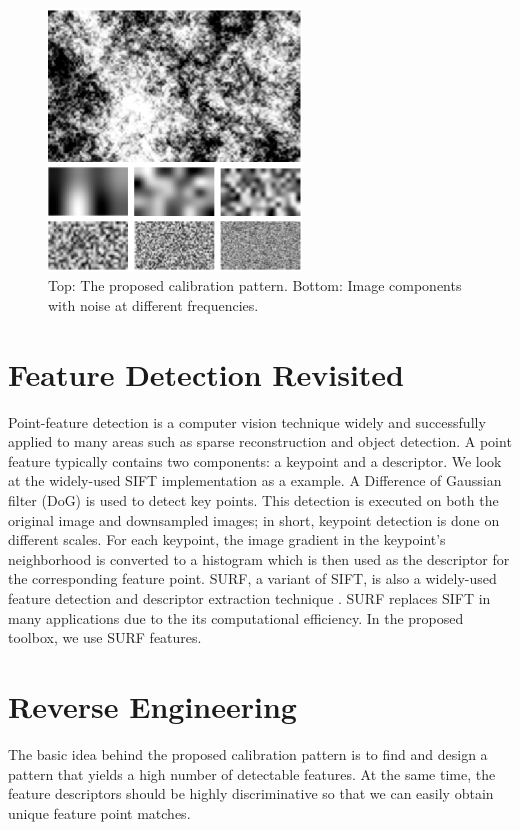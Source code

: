 \documentclass{report}
\begin{document}
\begin{figure}
\centering
\includegraphics[width=0.6\textwidth]{images/patternsample}
\caption{Top: The proposed calibration pattern. Bottom: Image components with noise at different frequencies.}
\label{PatternFig}
\end{figure}


\label{PatternSec}
\section{Feature Detection Revisited}

Point-feature detection is a computer vision technique widely and successfully applied to many areas such as sparse reconstruction and object detection. A point feature typically contains two components: a keypoint and a descriptor. We look at the widely-used SIFT implementation \cite{lowe2004distinctive} as a example. A Difference of Gaussian filter (DoG) is used to detect key points. This detection is executed on both the original image and downsampled images; in short, keypoint detection is done on different scales. For each keypoint, the image gradient in the keypoint's neighborhood is converted to a histogram which is then used as the descriptor for the corresponding feature point. SURF, a variant of SIFT, is also a widely-used feature detection and descriptor extraction technique \cite{bay2006surf}. SURF replaces SIFT in many applications due to the its computational efficiency. In the proposed toolbox, we use SURF features. 

\section{Reverse Engineering}
The basic idea behind the proposed calibration pattern is to find and design a pattern that yields a high number of detectable features. At the same time, the feature descriptors should be highly discriminative so that we can easily obtain unique feature point matches. 
\end{document}
